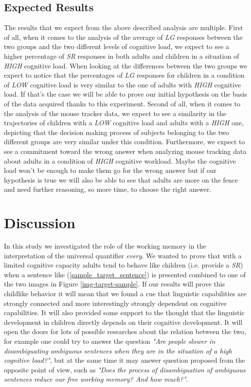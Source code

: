 \documentclass[10pt, a4]{article}
\begin{document}
\subsection{Expected Results}
The results that we expect from the above described analysis are multiple. First of all, when it comes to the analysis of the
average of \textit{LG} responses between the two groups and the two different levels of cognitive load, we expect to see a higher
percentage of \textit{SR} responses in both adults and children in a situation of \textit{HIGH} cognitive load. When looking at
the differences between the two groups we expect to notice that the percentages of \textit{LG} responses for children in a condition
of \textit{LOW} cognitive load is very similar to the one of adults with \textit{HIGH} cognitive load. If that's the case
we will be able to prove our initial hypothesis on the basis of the data acquired thanks to this experiment.
Second of all, when it comes to the analysis of the mouse tracker data, we expect to see a similarity in the trajectories
of children with a \textit{LOW} cognitive load and adults with a \textit{HIGH} one, depicting that the decision making process
of subjects belonging to the two different groups are very similar under this condition. Furthermore, we expect to see a commitment
toward the wrong answer when analyzing mouse tracking data about adults in a condition of \textit{HIGH} cognitive workload. Maybe
the cognitive load won't be enough to make them go for the wrong answer but if our hypothesis is true we will also be able to see that
adults are more on the fence and need further reasoning, so more time, to choose the right answer.\\

\section{Discussion}
In this study we investigated the role of the working memory in the interpretation of the universal quantifier \textit{every}.
We wanted to prove that with a limited cognitive capacity adults tend to behave like children (i.e. provide a \textit{SR})
when a sentence like (\ref{sample_target_sentence}) is presented combined to one of the two images in Figure \ref{img-target-sample}.
If our results will prove this childlike behavior it will mean that we found a cue that linguistic capabilities are strongly connected
and more interestingly strongly dependent on cognitive capabilities. It will also provided some support to the thought that
the linguistic development in children directly depends on their cognitive development. It will open the doors for lots of possible
researches about the relation between the two, for example one could try to answer the question \textit{"Are people slower in disambiguating
ambiguous sentences when they are in the situation of a high cognitive load?"}, but at the same time it may answer question proposed
from the opposite point of view, such as \textit{"Does the process of disambiguation of ambiguous sentences reduce our free working memory?
And how much?"}.



\setlength{\bibhang}{.125in}
\setlength{\bibindent}{-\bibhang}

\vfill
\pagebreak


\end{document}
